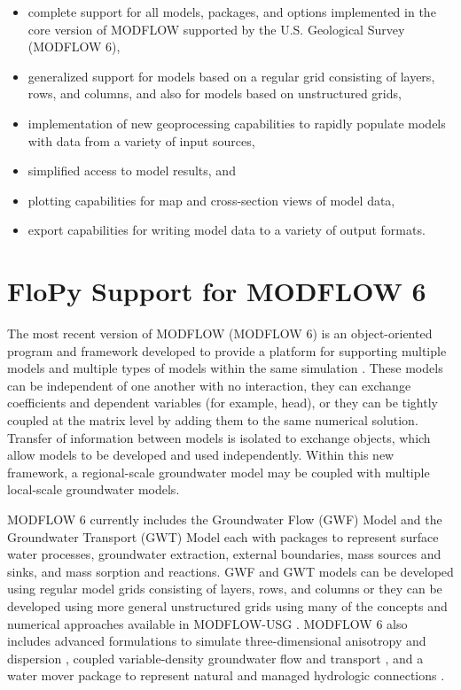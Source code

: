 \documentclass[11pt, oneside]{article}   	%
\begin{document}
\begin{itemize}
\item complete support for all models, packages, and options implemented in the core version of MODFLOW supported by the U.S. Geological Survey (MODFLOW 6),
\item generalized support for models based on a regular grid consisting of layers, rows, and columns, and also for models based on unstructured grids,
\item implementation of new geoprocessing capabilities to rapidly populate models with data from a variety of input sources, 
\item simplified access to model results, and
\item plotting capabilities for map and cross-section views of model data,
\item export capabilities for writing model data to a variety of output formats. 
\end{itemize}


\section{FloPy Support for MODFLOW 6}

The most recent version of MODFLOW (MODFLOW 6) is an object-oriented program and framework developed to provide a platform for supporting multiple models and multiple types of models within the same simulation \citep{modflow6gwf, modflow6framework, morway2021use}. These models can be independent of one another with no interaction, they can exchange coefficients and dependent variables (for example, head), or they can be tightly coupled at the matrix level by adding them to the same numerical solution. Transfer of information between models is isolated to exchange objects, which allow models to be developed and used independently. Within this new framework, a regional-scale groundwater model may be coupled with multiple local-scale groundwater models. 

MODFLOW 6 currently includes the Groundwater Flow (GWF) Model and the Groundwater Transport (GWT) Model each with packages to represent surface water processes,  groundwater extraction, external boundaries, mass sources and sinks, and mass sorption and reactions.  GWF and GWT models can be developed using regular model grids consisting of layers, rows, and columns or they can be developed using more general unstructured grids using many of the concepts and numerical approaches available in MODFLOW-USG  \citep{modflowusg}.  MODFLOW 6 also includes advanced formulations to simulate three-dimensional anisotropy and dispersion \citep{modflow6xt3d}, coupled variable-density groundwater flow and transport \citep{langevin2020hydraulic}, and a water mover package to represent natural and managed hydrologic connections \citep{morway2021use}.
\end{document}
